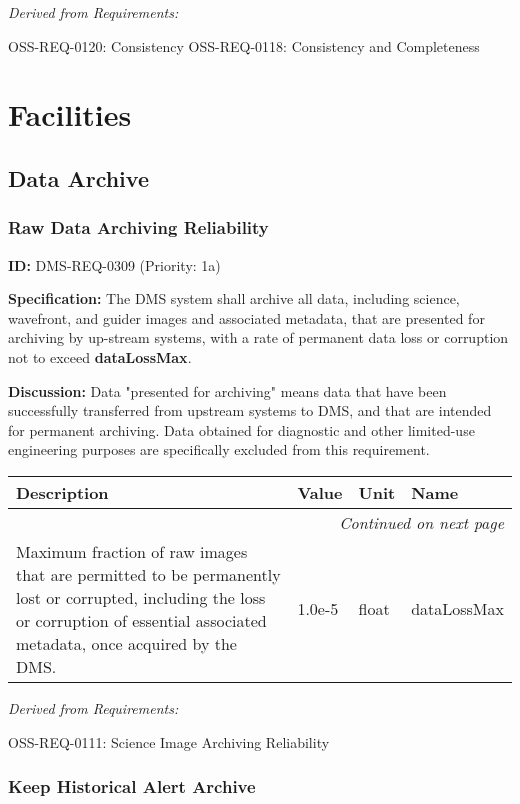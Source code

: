 \documentclass[SE,toc,lsstdraft]{lsstdoc}
\makeatletter
\newcommand{\paramname}[1]{\hspace{0pt}#1}
\newcommand{\unitname}[1]{\hspace{0pt}#1}
\newenvironment{parameters}[0]{%
\setlength\LTleft{0pt}
\setlength\LTright{\fill}
\begin{small}
\begin{longtable}[]{|p{0.49\textwidth}|l|p{0.6in}|p{1.70in}@{}|}

\hline \textbf{Description} & \textbf{Value} & \textbf{Unit} & \textbf{Name} \\ \hline
\endhead

\hline \multicolumn{4}{r}{\emph{Continued on next page}} \\
\endfoot

\hline\hline
\endlastfoot
}{%
\hline
\end{longtable}
\end{small}
}
\makeatother
\begin{document}
\emph{Derived from Requirements:}

OSS-REQ-0120:
Consistency \newline
OSS-REQ-0118:
Consistency and Completeness \newline

\section{Facilities}

\subsection{Data Archive}

\subsubsection{Raw Data Archiving Reliability}

\label{DMS-REQ-0309}
\textbf{ID:} DMS-REQ-0309 (Priority: 1a)

\textbf{Specification:} The DMS system shall archive all data, including science, wavefront, and guider images and associated metadata, that are presented for archiving by up-stream systems, with a rate of permanent data loss or corruption not to exceed \textbf{dataLossMax}.

\textbf{Discussion: }Data "presented for archiving" means data that have been successfully transferred from upstream systems to DMS, and that are intended for permanent archiving. Data obtained for diagnostic and other limited-use engineering purposes are specifically excluded from this requirement.

\begin{parameters}
Maximum fraction of raw images that are permitted to be permanently lost or corrupted, including the loss or corruption of essential associated metadata, once acquired by the DMS.
&
1.0e-5
&
\unitname{%
float
}
&
\paramname{%
dataLossMax
} \\\hline
\end{parameters}

\emph{Derived from Requirements:}

OSS-REQ-0111:
Science Image Archiving Reliability \newline

\subsubsection{Keep Historical Alert Archive}
\end{document}
